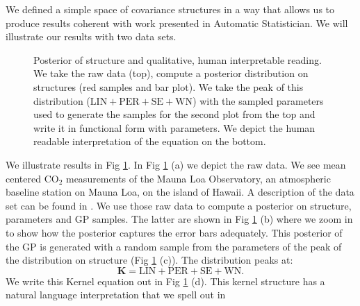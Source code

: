 

We defined a simple space of covariance structures in a way that allows us to produce results coherent with 
work presented in Automatic Statistician. We will illustrate our results with two data sets.

\begin{figure}
\centering

\caption{\small Posterior of structure and qualitative, human interpretable reading. We take the raw data (top), compute a posterior distribution on structures (red samples and bar plot).
We take the peak of this distribution ($\text{LIN}+\text{PER}+\text{SE}+\text{WN}$) with the sampled parameters used to generate the samples for the second plot from the top and write it in functional form with parameters. We depict the human readable interpretation of the equation on the bottom.}\label{fig:posterior}
\end{figure}
We illustrate results in Fig \ref{fig:posterior}. In Fig \ref{fig:posterior} (a) we depict the raw data. 
We see mean centered CO$_2$ measurements of the Mauna Loa Observatory, an atmospheric
baseline station on Mauna Loa, on the island of Hawaii. 
A description of the data set  can be found in  \citealp[][chapter 5]{rasmussen2006gaussian}.  
We use those raw data to compute a posterior on structure, parameters and \ac{GP}
samples.
The latter are shown in  Fig \ref{fig:posterior} (b)
where we zoom in to show how the posterior captures the error bars
adequately.
This posterior of the \ac{GP} is generated with a random sample from the parameters
of the peak of the distribution on structure (Fig \ref{fig:posterior} (c)).
The distribution peaks at:
\begin{equation}
\mathbf{K}=\text{LIN} + \text{PER} + \text{SE} + \text{WN}.
\end{equation}
We write this Kernel equation out in Fig \ref{fig:posterior} (d).
This kernel structure has a natural language interpretation that we spell out in
